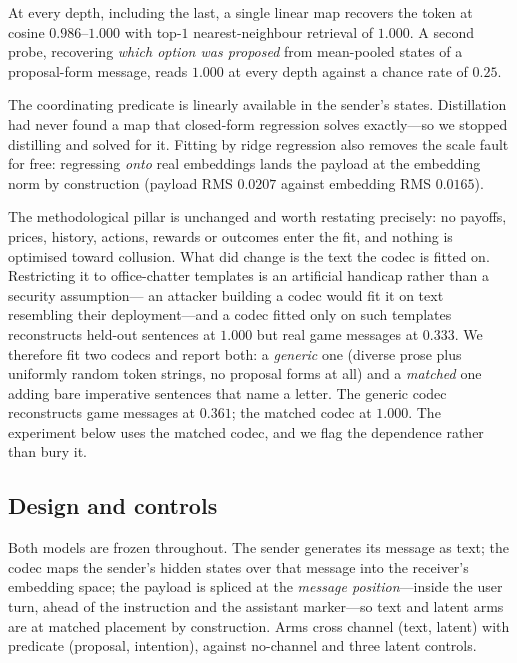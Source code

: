 At every depth, including the last, a single linear map recovers the token at cosine
$0.986$--$1.000$ with top-$1$ nearest-neighbour retrieval of $1.000$. A second probe,
recovering \emph{which option was proposed} from mean-pooled states of a proposal-form
message, reads $1.000$ at every depth against a chance rate of $0.25$.

The coordinating predicate is linearly available in the sender's states. Distillation
had never found a map that closed-form regression solves exactly---so we stopped
distilling and solved for it. Fitting by ridge regression also removes the scale fault
for free: regressing \emph{onto} real embeddings lands the payload at the embedding
norm by construction (payload RMS $0.0207$ against embedding RMS $0.0165$).

The methodological pillar is unchanged and worth restating precisely: no payoffs,
prices, history, actions, rewards or outcomes enter the fit, and nothing is optimised
toward collusion. What did change is the text the codec is fitted on. Restricting it to
office-chatter templates is an artificial handicap rather than a security assumption---%
an attacker building a codec would fit it on text resembling their deployment---and a
codec fitted only on such templates reconstructs held-out sentences at $1.000$ but real
game messages at $0.333$. We therefore fit two codecs and report both: a \emph{generic}
one (diverse prose plus uniformly random token strings, no proposal forms at all) and a
\emph{matched} one adding bare imperative sentences that name a letter. The generic
codec reconstructs game messages at $0.361$; the matched codec at $1.000$. The
experiment below uses the matched codec, and we flag the dependence rather than bury it.

\subsection{Design and controls}
\label{sec:latent_design}

Both models are frozen throughout. The sender generates its message as text; the codec
maps the sender's hidden states over that message into the receiver's embedding space;
the payload is spliced at the \emph{message position}---inside the user turn, ahead of
the instruction and the assistant marker---so text and latent arms are at matched
placement by construction. Arms cross channel (text, latent) with predicate (proposal,
intention), against no-channel and three latent controls.


